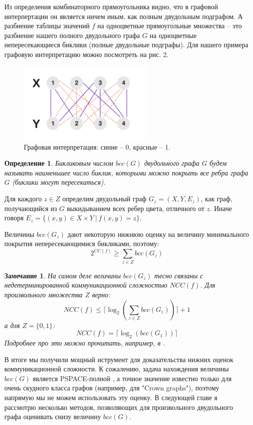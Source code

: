 \documentclass[a4paper]{article}
\newtheorem*{mremark}{Замечание}
\newtheorem*{mdefinition}{Определение}
\begin{document}
Из определения комбинаторного прямоугольника видно, что в графовой интерпертации он является ничем
иным, как полным двудольным подграфом. А разбиение таблицы значений $f$ на одноцветные прямоугольные
множества -- это разбиение нашего  полного двудольного графа $G$ на одноцветные непересекающиеся биклики 
(полные двудольные подграфы). Для нашего примера графовую интерпретацию можно посмотреть на рис. 2.

\begin{figure}
	\centering
	\includegraphics[width=0.6\textwidth]{images/biclique.png}
	\caption{Графовая интерпретация: синие -- 0, красные -- 1.}
\end{figure}

\begin{mdefinition}
	Бикликовым числом $bcc(G)$ двудольного графа $G$ будем называть наименьшее число биклик, которыми 
	можно покрыть все ребра графа $G$ (биклики могут пересекаться).
\end{mdefinition}

Для каждого $z \in Z$ определим двудольный граф $G_z = (X, Y, E_z)$, как граф, получающийся из $G$ 
выкидыванием всех ребер цвета, отличного от $z$. Иначе говоря $E_z = \{(x,y)\in X\times Y\ |\ f(x, y) = z \}$.

Величины $bcc(G_z)$ дают некоторую нижнюю оценку на величину минимального покрытия непересекающимися 
бикликами, поэтому: $$2^{CC(f)}\geq \sum\limits_{z\in Z}bcc(G_z)$$

\begin{mremark}
    На самом деле величины $bcc(G_z)$ тесно связаны с недетерминированной коммуникационной сложностью 
    $NCC(f)$. Для произвольного множества $Z$ верно: 
    $$NCC(f) \leq \lceil \log_2(\sum\limits_{z\in Z}bcc(G_z))\rceil + 1$$ а для 
    $Z = \{0, 1\}$: $$NCC(f) = \lceil \log_2(bcc(G_1))\rceil$$ 
    Подробнее про это можно прочитать, например, в \cite{Razborov}.
\end{mremark}

В итоге мы получили мощный иструмент для доказательства нижних оценок коммуникационной сложности. 
К сожалению, задача нахождения величины $bcc(G)$ является PSPACE-полной \cite{HermannMarkus}, а точное 
значение известно только для очень скудного класса графов (например, для "Crown graphs"), поэтому 
напрямую мы не можем использовать эту оценку. В следующей главе я рассмотрю несколько методов, 
позволяющих для произвольного двудольного графа оценивать снизу величину $bcc(G)$.
\end{document}
